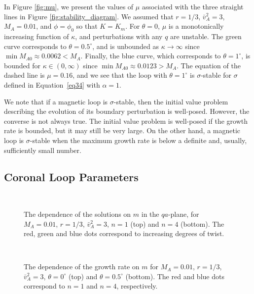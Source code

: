 \documentclass[12pt]{ociamthesis}
\begin{document}
In Figure \ref{fig:mu}, we present the values of $\mu$ associated with the three straight lines in Figure \ref{fig:stability_diagram}.
We assumed that $r = 1/3$, $\bar v_A^2 = 3$, $M_A = 0.01$, and $\phi = \phi_0$ so that $K = K_m$\/.
For $\theta = 0$, $\mu$ is a monotonically increasing function of $\kappa$, and perturbations with any $q$ are unstable.
The green curve corresponds to $\theta = 0.5^\circ$, and is unbounded as $\kappa \to \infty$ since $\min M_{A0} \approx 0.0062 < M_A$.
Finally, the blue curve, which corresponds to $\theta = 1^\circ$, is bounded for $\kappa \in (0,\infty)$ since $\min M_{A0} \approx 0.0123 > M_A$.
The equation of the dashed line is $\mu = 0.16$, and we see that the loop with $\theta = 1^\circ$ is $\sigma$-stable for $\sigma$ defined in Equation~\eqref{eq34} with $\alpha = 1$.

We note that if a magnetic loop is $\sigma$-stable, then the initial value problem describing the evolution of its boundary perturbation is well-posed.
However, the converse is not always true.
The initial value problem is well-posed if the growth rate is bounded, but it may still be very large.
On the other hand, a magnetic loop is $\sigma$-stable when the maximum growth rate is below a definite and, usually, sufficiently small number.

\subsection{Coronal Loop Parameters}
\label{subsec:loop}

\begin{figure}[!ht]
\centering
{}
\\
\caption{
The dependence of the solutions on $m$ in the $qa$-plane, for $M_A = 0.01$, $r = 1/3$, 
$\bar{v}_A^2 = 3$, $n=1$ (top) and $n=4$ (bottom).
The red, green and blue dots correspond to increasing degrees of twist.
}
\label{fig:stability_loop}
\end{figure}

\begin{figure}[!ht]
\centering
\subfloat[$\theta=0^\circ$]
{\texttt{[image: figures/loop\_tilt\_growth\_theta=0.png]}}
\\
\subfloat[$\theta=0.5^\circ$]
{\texttt{[image: figures/loop\_tilt\_growth\_theta=05.png]}}
\caption{
The dependence of the growth rate on $m$ for $M_A = 0.01$, $r = 1/3$, 
$\bar{v}_A^2 = 3$, $\theta=0^\circ$ (top) and $\theta=0.5^\circ$ (bottom).
The red and blue dots correspond to $n=1$ and $n=4$, respectively.
}
\label{fig:growth_loop}
\end{figure}
\end{document}
